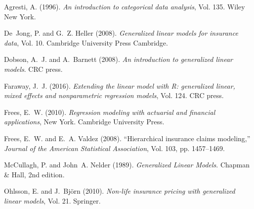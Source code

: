 \documentclass[12pt]{article}
\begin{document}
\begin{thebibliography}{xxx}

Agresti, A. (1996).  {\it An introduction to categorical data analysis}, Vol.
  135. Wiley New York.

De~Jong, P. and G.~Z. Heller (2008).  {\it Generalized linear models for
  insurance data}, Vol. 10. Cambridge University Press Cambridge.

Dobson, A.~J. and A.~Barnett (2008).  {\it An introduction to generalized
  linear models}. CRC press.

Faraway, J.~J. (2016).  {\it Extending the linear model with R: generalized
  linear, mixed effects and nonparametric regression models}, Vol. 124. CRC
  press.

Frees, E.~W. (2010).  {\it Regression modeling with actuarial and financial
  applications}, New York. Cambridge University Press.

Frees, E.~W. and E.~A. Valdez (2008). ``Hierarchical insurance claims
  modeling,'' {\it Journal of the American Statistical Association}, Vol. 103,
  pp. 1457--1469.

McCullagh, P. and John~A. Nelder (1989).  {\it Generalized Linear Models}.
  Chapman \& Hall, 2nd edition.

Ohlsson, E. and J.~Bj{\"o}rn (2010).  {\it Non-life insurance pricing with
  generalized linear models}, Vol. 21. Springer.

\end{thebibliography}
\end{document}
